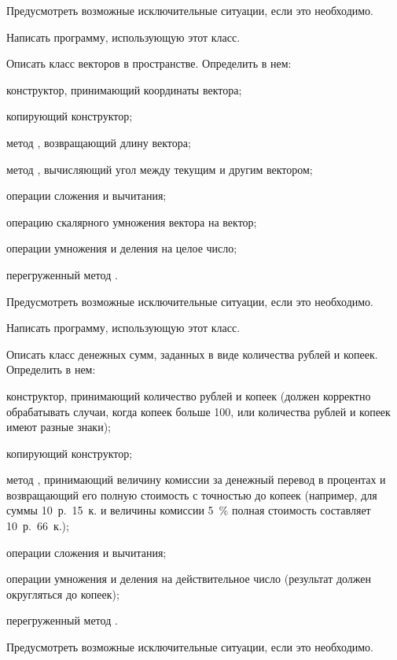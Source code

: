 Предусмотреть возможные исключительные ситуации, если это необходимо.

Написать программу, использующую этот класс.

\task Описать класс  векторов в пространстве. Определить
в нем:
\begin{itemize*}
\item конструктор, принимающий координаты вектора;
\item копирующий конструктор;
\item метод , возвращающий длину вектора;
\item метод , вычисляющий угол между текущим и другим
  вектором;
\item операции сложения и вычитания;
\item операцию скалярного умножения вектора на вектор;
\item операции умножения и деления на целое число;
\item перегруженный метод .
\end{itemize*}

Предусмотреть возможные исключительные ситуации, если это необходимо.

Написать программу, использующую этот класс.

\task Описать класс  денежных сумм, заданных в виде
количества рублей и копеек.  Определить в нем:
\begin{itemize*}
\item конструктор, принимающий количество рублей и копеек (должен
  корректно обрабатывать случаи, когда копеек больше 100, или
  количества рублей и копеек имеют разные знаки);
\item копирующий конструктор;
\item метод , принимающий величину комиссии за
  денежный перевод в процентах и возвращающий его полную стоимость с
  точностью до копеек (например, для суммы 10~р.~15~к. и величины
  комиссии 5~\% полная стоимость составляет 10~р.~66~к.);
\item операции сложения и вычитания;
\item операции умножения и деления на действительное число (результат
  должен округляться до копеек);
\item перегруженный метод .
\end{itemize*}

Предусмотреть возможные исключительные ситуации, если это необходимо.

